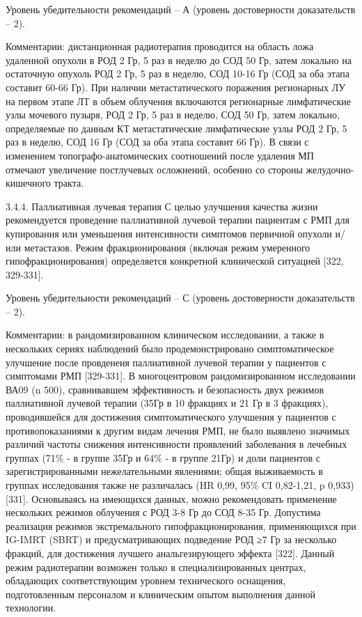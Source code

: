 Уровень убедительности рекомендаций – А (уровень достоверности доказательств – 2).

Комментарии: дистанционная радиотерапия проводится на область ложа удаленной опухоли в РОД 2 Гр, 5 раз в неделю до СОД 50 Гр, затем локально на остаточную опухоль РОД 2 Гр, 5 раз в неделю, СОД 10-16 Гр (СОД за оба этапа составит 60-66 Гр). При наличии метастатического поражения регионарных ЛУ на первом этапе ЛТ в объем облучения включаются регионарные лимфатические узлы мочевого пузыря, РОД 2 Гр, 5 раз в неделю, СОД 50 Гр, затем локально, определяемые по данным КТ метастатические лимфатические узлы РОД 2 Гр, 5 раз в неделю, СОД 16 Гр (СОД за оба этапа составит 66 Гр). В связи с изменением топографо-анатомических соотношений после удаления МП отмечают увеличение постлучевых осложнений, особенно со стороны желудочно-кишечного тракта.

3.4.4. Паллиативная лучевая терапия
С целью улучшения качества жизни рекомендуется проведение паллиативной лучевой терапии пациентам с РМП для купирования или уменьшения интенсивности симптомов первичной опухоли и/или метастазов. Режим фракционирования (включая режим умеренного гипофракционирования) определяется конкретной клинической ситуацией [322, 329-331].

Уровень убедительности рекомендаций – С (уровень достоверности доказательств – 2).

Комментарии: в рандомизированном клиническом исследовании, а также в нескольких сериях наблюдений было продемонстрировано симптоматическое улучшение после провденеия паллиативной лучевой терапии у пациентов с симптомами РМП [329-331]. В многоцентровом рандомизированном исследовании ВА09 (n 500), сравнивавшем эффективность и безопасность двух режимов паллиативной лучевой терапии (35Гр в 10 фракциях и 21 Гр в 3 фракциях), проводившейся для достижения симптоматического улучшения у пациентов с противопоказаниями к другим видам лечения РМП, не было выявлено значимых различий частоты снижения интенсивности проявлений заболевания в лечебных группах (71\% - в группе 35Гр и 64\% - в группе 21Гр) и доли пациентов с зарегистрированными нежелательными явлениями; общая выживаемость в группах исследования также не различалась (HR 0,99, 95\% CI 0,82-1,21, p 0,933) [331]. Основываясь на имеющихся данных, можно рекомендовать  применение нескольких режимов облучения с РОД 3-8 Гр до СОД 8-35 Гр. Допустима реализация режимов экстремального гипофракционирования, применяющихся при IG-IMRT (SBRT) и предусматривающих подведение РОД ≥7 Гр за несколько фракций, для достижения лучшего анальгезирующего эффекта [322]. Данный режим радиотерапии возможен только в специализированных центрах, обладающих соответствующим уровнем технического оснащения, подготовленным персоналом и клиническим опытом выполнения данной технологии.

